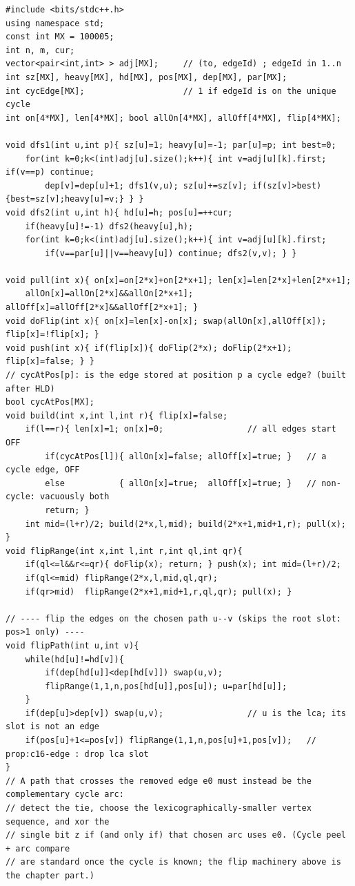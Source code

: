 \begin{lstlisting}[caption={CF 117E Summit: cut the cycle edge e0, heavy-light the spanning tree, and keep a mergeable (on-count, all-cycle-on/off) state under a lazy flip; the component count is read from the root as n - on - z + [allOn and z]}, label={lst:c16-summit}]
#include <bits/stdc++.h>
using namespace std;
const int MX = 100005;
int n, m, cur;
vector<pair<int,int> > adj[MX];     // (to, edgeId) ; edgeId in 1..n
int sz[MX], heavy[MX], hd[MX], pos[MX], dep[MX], par[MX];
int cycEdge[MX];                    // 1 if edgeId is on the unique cycle
int on[4*MX], len[4*MX]; bool allOn[4*MX], allOff[4*MX], flip[4*MX];

void dfs1(int u,int p){ sz[u]=1; heavy[u]=-1; par[u]=p; int best=0;
    for(int k=0;k<(int)adj[u].size();k++){ int v=adj[u][k].first; if(v==p) continue;
        dep[v]=dep[u]+1; dfs1(v,u); sz[u]+=sz[v]; if(sz[v]>best){best=sz[v];heavy[u]=v;} } }
void dfs2(int u,int h){ hd[u]=h; pos[u]=++cur;
    if(heavy[u]!=-1) dfs2(heavy[u],h);
    for(int k=0;k<(int)adj[u].size();k++){ int v=adj[u][k].first;
        if(v==par[u]||v==heavy[u]) continue; dfs2(v,v); } }

void pull(int x){ on[x]=on[2*x]+on[2*x+1]; len[x]=len[2*x]+len[2*x+1];
    allOn[x]=allOn[2*x]&&allOn[2*x+1]; allOff[x]=allOff[2*x]&&allOff[2*x+1]; }
void doFlip(int x){ on[x]=len[x]-on[x]; swap(allOn[x],allOff[x]); flip[x]=!flip[x]; }
void push(int x){ if(flip[x]){ doFlip(2*x); doFlip(2*x+1); flip[x]=false; } }
// cycAtPos[p]: is the edge stored at position p a cycle edge? (built after HLD)
bool cycAtPos[MX];
void build(int x,int l,int r){ flip[x]=false;
    if(l==r){ len[x]=1; on[x]=0;                 // all edges start OFF
        if(cycAtPos[l]){ allOn[x]=false; allOff[x]=true; }   // a cycle edge, OFF
        else           { allOn[x]=true;  allOff[x]=true; }   // non-cycle: vacuously both
        return; }
    int mid=(l+r)/2; build(2*x,l,mid); build(2*x+1,mid+1,r); pull(x); }
void flipRange(int x,int l,int r,int ql,int qr){
    if(ql<=l&&r<=qr){ doFlip(x); return; } push(x); int mid=(l+r)/2;
    if(ql<=mid) flipRange(2*x,l,mid,ql,qr);
    if(qr>mid)  flipRange(2*x+1,mid+1,r,ql,qr); pull(x); }

// ---- flip the edges on the chosen path u--v (skips the root slot: pos>1 only) ----
void flipPath(int u,int v){
    while(hd[u]!=hd[v]){
        if(dep[hd[u]]<dep[hd[v]]) swap(u,v);
        flipRange(1,1,n,pos[hd[u]],pos[u]); u=par[hd[u]];
    }
    if(dep[u]>dep[v]) swap(u,v);                 // u is the lca; its slot is not an edge
    if(pos[u]+1<=pos[v]) flipRange(1,1,n,pos[u]+1,pos[v]);   // prop:c16-edge : drop lca slot
}
// A path that crosses the removed edge e0 must instead be the complementary cycle arc:
// detect the tie, choose the lexicographically-smaller vertex sequence, and xor the
// single bit z if (and only if) that chosen arc uses e0. (Cycle peel + arc compare
// are standard once the cycle is known; the flip machinery above is the chapter part.)


\end{lstlisting}
